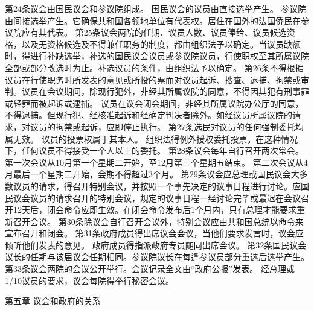     第24条议会由国民议会和参议院组成。
    国民议会的议员由直接选举产生。
    参议院由间接选举产生。它确保共和国各领地单位有代表权。居住在国外的法国侨民在参议院应有其代表。
    第25条议会两院的任期、议员人数、议员俸给、议员候选资格，以及无资格候选及不得兼任职务的制度，都由组织法予以确定。当议员缺额时，得进行补缺选举，补选的国民议会议员或参议院议员，行使职权至其所属议院全部或部分改选时为止。补选议员的条件，由组织法予以确定。
    第26条不得根据议员在行使职务时所发表的意见或所投的票而对议员起诉、搜查、逮捕、拘禁或审判。议员在会议期间，除现行犯外，非经其所属议院的同意，不得因其犯有刑事罪或轻罪而被起诉或逮捕。
    议员在议会闭会期间，非经其所属议院办公厅的同意，不得逮捕。但现行犯、经核准起诉和经确定判决者除外。如经议员所属议院的请求，对议员的拘禁或起诉，应即停止执行。
    第27条选民对议员的任何强制委托均属无效。
    议员的投票权属于其本人。
    组织法得例外授权委托投票。在这种情况下，任何议员不得接受一个人以上的委托。
    第28条议会每年自行召开两次常会。
    第一次会议从10月第一个星期二开始，至12月第三个星期五结束。
    第二次会议从4月最后一个星期二开始，会期不得超过3个月。
    第29条议会应总理或国民议会大多数议员的请求，得召开特别会议，并按照一个事先决定的议事日程进行讨论。应国民议会议员的请求召开的特别会议，规定的议事日程一经讨论完毕或最迟在会议召开12天后，闭会命令应即生效。在闭会命令发布后1个月内，只有总理才能要求重新召开会议。
    第30条除议会自行召开会议外，特别会议应由共和国总统以命令来宣布召开和闭会。
    第31条政府成员得出席议会会议，当他们要求发言时，议会应倾听他们发表的意见。
    政府成员得指派政府专员随同出席会议。
    第32条国民议会议长的任期与该届议会任期相同。参议院议长在每逢参议员部分重选后选举产生。
    第33条议会两院的会议公开举行。会议记录全文由“政府公报”发表。
    经总理或1/10议员的要求，议会每院得举行秘密会议。
 
                    第五章    议会和政府的关系
 
